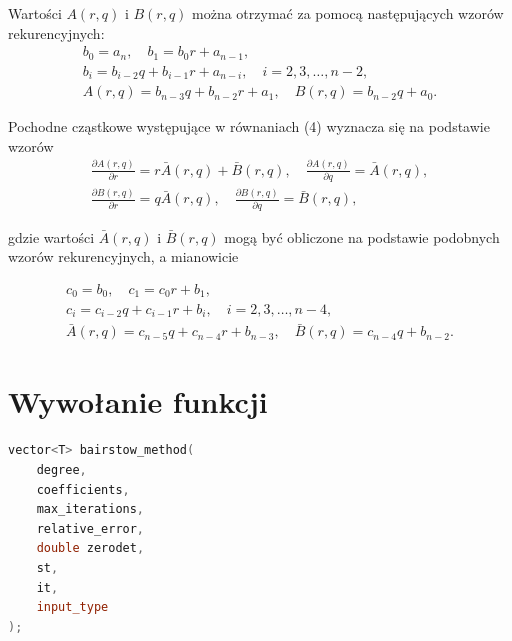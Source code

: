 \documentclass[12pt,a4paper]{article}
\begin{document}
		Wartości $A(r, q)$ i $B(r, q)$ można otrzymać za pomocą następujących wzorów rekurencyjnych:
		\begin{gather*}
			b_0 = a_n, \quad b_1 = b_0 r + a_{n-1}, \\[1ex]
			b_i = b_{i-2} q + b_{i-1} r + a_{n-i}, \quad i = 2, 3, \dots, n-2, \\[1ex]
			A(r, q) = b_{n-3} q + b_{n-2} r + a_1, \quad B(r, q) = b_{n-2} q + a_0.
		\end{gather*}
		
		Pochodne cząstkowe występujące w równaniach (4) wyznacza się na podstawie wzorów
		\begin{gather*}
			\frac{\partial A(r, q)}{\partial r} = r\bar{A}(r, q) + \bar{B}(r, q), \quad \frac{\partial A(r, q)}{\partial q} = \bar{A}(r, q), \\[2ex]
			\frac{\partial B(r, q)}{\partial r} = q\bar{A}(r, q), \quad \frac{\partial B(r, q)}{\partial q} = \bar{B}(r, q),
		\end{gather*}
		
		gdzie wartości $\bar{A}(r, q)$ i $\bar{B}(r, q)$ mogą być obliczone na podstawie podobnych wzorów
		rekurencyjnych, a mianowicie
	
		\begin{gather*}
			c_0 = b_0, \quad c_1 = c_0r + b_1, \\
			c_i = c_{i-2}q + c_{i-1}r + b_i, \quad i = 2,3,\dots,n-4, \\
			\bar{A}(r,q) = c_{n-5}q + c_{n-4}r + b_{n-3}, \quad \bar{B}(r,q) = c_{n-4}q + b_{n-2}.
		\end{gather*}
	
	\section{Wywołanie funkcji}

	\begin{lstlisting}[language=C++, frame=single, basicstyle=\ttfamily\small]
vector<T> bairstow_method(
	degree, 
	coefficients, 
	max_iterations, 
	relative_error,
	double zerodet, 
	st, 
	it, 
	input_type
);

\end{lstlisting}
	
\end{document}
